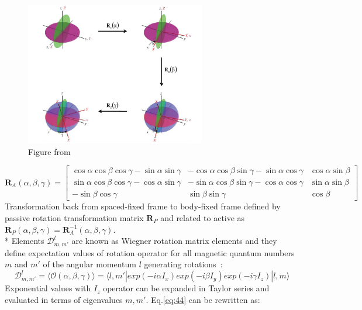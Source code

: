 \begin{figure}[h]
\centering
\includegraphics[width=0.7\textwidth]{figures/chap1/rot.png}
\caption{Figure from \cite{mul}}
\end{figure}
\begin{equation}\label{eq:43}
\textbf{R}_A(\alpha,\beta,\gamma) = \begin{bmatrix}
       \cos\alpha \cos\beta \cos\gamma-\sin\alpha \sin\gamma & -\cos\alpha \cos\beta \sin\gamma-\sin\alpha \cos\gamma & \cos\alpha\sin\beta         \\[0.3em]
       \sin\alpha \cos\beta \cos\gamma-\cos\alpha \sin\gamma & -\sin\alpha \cos\beta \sin\gamma-\cos\alpha \cos\gamma & \sin\alpha\sin\beta  \\[0.3em]
       -\sin \beta \cos\gamma & \sin \beta \sin\gamma & \cos \beta
     \end{bmatrix}     
\end{equation}
Transformation back from spaced-fixed frame to body-fixed frame defined by passive rotation transformation matrix $\textbf{R}_P$ and related to active as $\textbf{R}_P(\alpha,\beta,\gamma)=\textbf{R}_A^{-1}(\alpha,\beta,\gamma)$. \\*
Elements $\mathcal{D}_{m,m'}^l$ are known as Wiegner rotation matrix elements and they define expectation values of rotation operator for all magnetic quantum numbers $m$ and $m'$ of the angular momentum $l$ generating rotations~\cite{tomog}: 
\begin{equation}\label{eq:44}
\mathcal{D}_{m,m'}^l=\langle \mathcal{O}(\alpha,\beta,\gamma)\rangle= \langle l,m'|exp(-i\alpha I_x)exp(-i\beta I_y)exp(-i\gamma I_z)|l,m\rangle
\end{equation}
Exponential values with $I_z$ operator can be expanded in Taylor series and evaluated in terms of eigenvalues $m,m'$\cite{brink}. Eq.\ref{eq:44} can be rewritten as:
